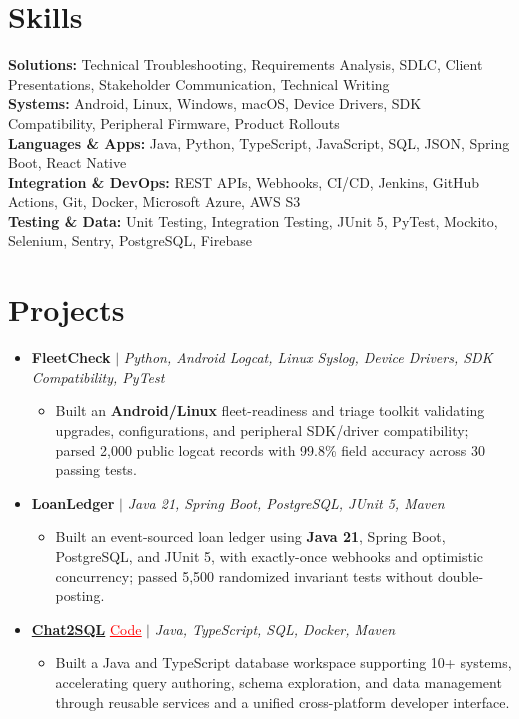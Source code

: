 \documentclass[letterpaper,10pt]{article}
\newcommand{\itemTail}{\vspace{-6pt}}
\newcommand{\sectionGap}{\vspace{-8pt}}
\newcommand{\projGap}{\vspace{1pt}}
\newcommand{\resumeItem}[1]{\item\small{{#1 \itemTail}}}
\newcommand{\resumeProjectHeading}[1]{\item \small #1 \vspace{-2pt}}
\newcommand{\resumeProjectLink}[2]{\href{#1}{\textcolor{red}{\underline{#2}}}}
\newcommand{\resumeSubHeadingListStart}{\begin{itemize}[leftmargin=0.0in, label={}]}
\newcommand{\resumeSubHeadingListEnd}{\end{itemize}}
\newcommand{\resumeProjItemListStart}{\begin{itemize}[leftmargin=0.15in,label=\textbullet,itemsep=3pt,topsep=0pt,parsep=0pt,partopsep=0pt]}
\newcommand{\resumeProjItemListEnd}{\end{itemize}\vspace{-4pt}}
\begin{document}
\section{Skills}
\begin{itemize}[leftmargin=0.15in, label={}]
\small{\item{
\textbf{Solutions:} Technical Troubleshooting, Requirements Analysis, SDLC, Client Presentations, Stakeholder Communication, Technical Writing \\
\textbf{Systems:} Android, Linux, Windows, macOS, Device Drivers, SDK Compatibility, Peripheral Firmware, Product Rollouts \\
\textbf{Languages \& Apps:} Java, Python, TypeScript, JavaScript, SQL, JSON, Spring Boot, React Native \\
\textbf{Integration \& DevOps:} REST APIs, Webhooks, CI/CD, Jenkins, GitHub Actions, Git, Docker, Microsoft Azure, AWS S3 \\
\textbf{Testing \& Data:} Unit Testing, Integration Testing, JUnit 5, PyTest, Mockito, Selenium, Sentry, PostgreSQL, Firebase
}}
\end{itemize}
\sectionGap
\section{Projects}
\resumeSubHeadingListStart
\vspace{3pt}
\resumeProjectHeading{\textbf{FleetCheck} $|$ \emph{Python, Android Logcat, Linux Syslog, Device Drivers, SDK Compatibility, PyTest}}
\resumeProjItemListStart
\resumeItem{Built an \textbf{Android/Linux} fleet-readiness and triage toolkit validating upgrades, configurations, and peripheral SDK/driver compatibility; parsed 2,000 public logcat records with 99.8\% field accuracy across 30 passing tests.}
\resumeProjItemListEnd
\projGap
\resumeProjectHeading{\textbf{LoanLedger} $|$ \emph{Java 21, Spring Boot, PostgreSQL, JUnit 5, Maven}}
\resumeProjItemListStart
\resumeItem{Built an event-sourced loan ledger using \textbf{Java 21}, Spring Boot, PostgreSQL, and JUnit 5, with exactly-once webhooks and optimistic concurrency; passed 5,500 randomized invariant tests without double-posting.}
\resumeProjItemListEnd
\projGap
\resumeProjectHeading{\href{https://github.com/SAHAJ-BHADJA/Chat2SQL}{\textbf{Chat2SQL}} \resumeProjectLink{https://github.com/SAHAJ-BHADJA/Chat2SQL}{Code} $|$ \emph{Java, TypeScript, SQL, Docker, Maven}}
\resumeProjItemListStart
\resumeItem{Built a Java and TypeScript database workspace supporting 10+ systems, accelerating query authoring, schema exploration, and data management through reusable services and a unified cross-platform developer interface.}
\resumeProjItemListEnd
\resumeSubHeadingListEnd
\end{document}
